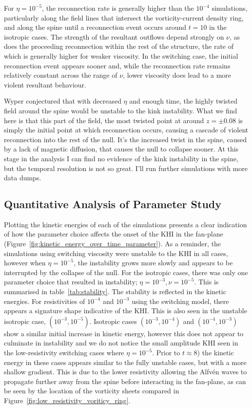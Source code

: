 For $\eta=10^{-5}$, the reconnection rate is generally higher than the $10^{-4}$ simulations, particularly along the field lines that intersect the vorticity-current density ring, and along the spine until a reconnection event occurs around $t=10$ in the isotropic cases. The strength of the resultant outflows depend strongly on $\nu$, as does the proceeding reconnection within the rest of the structure, the rate of which is generally higher for weaker viscosity. In the switching case, the initial reconnection event appears sooner and, while the reconnection rate remains relatively constant across the range of $\nu$, lower viscosity does lead to a more violent resultant behaviour.

Wyper conjectured that with decreased $\eta$ and enough time, the highly twisted field around the spine would be unstable to the kink instability. What we find here is that this part of the field, the most twisted point at around $z=\pm 0.08$ is simply the initial point at which reconnection occurs, causing a cascade of violent reconnection into the rest of the null. It's the increased twist in the spine, caused by a lack of magnetic diffusion, that causes the null to collapse sooner. At this stage in the analysis I can find no evidence of the kink instability in the spine, but the temporal resolution is not so great. I'll run further simulations with more data dumps.

\subsection{Quantitative Analysis of Parameter Study}

Plotting the kinetic energies of each of the simulations presents a clear indication of how the parameter choice affects the onset of the KHI in the fan-plane (Figure~\ref{fig:kinetic_energy_over_time_parameter}). As a reminder, the simulations using switching viscosity were unstable to the KHI in all cases, however when $\eta = 10^{-5}$, the instability grows more slowly and appears to be interrupted by the collapse of the null. For the isotropic cases, there was only one parameter choice that resulted in instability; $\eta=10^{-3}, \nu=10^{-5}$. This is summarised in table~\ref{tab:stability}. The stability is reflected in the kinetic energies. For resistivities of $10^{-4}$ and $10^{-3}$ using the switching model, there appears a signature shape indicative of the KHI. This is also seen in the unstable isotropic case, $(10^{-3}, 10^{-5})$. Isotropic cases $(10^{-3}, 10^{-4})$ and $(10^{-4}, 10^{-3})$ show a similar initial increase in kinetic energy, however this does not appear to culminate in instability and we do not notice the small amplitude KHI seen in the low-resistivity switching cases where $\eta=10^{-5}$. Prior to $t\approx 8$) the kinetic energy in these cases appears similar to the fully unstable cases, but with a more shallow gradient. This is due to the lower resistivity allowing the Alfv\'en waves to propagate further away from the spine before interacting in the fan-plane, as can be seen by the location of the vorticity sheets compared in Figure~\ref{fig:low_resistivity_voriticy_ring}.

